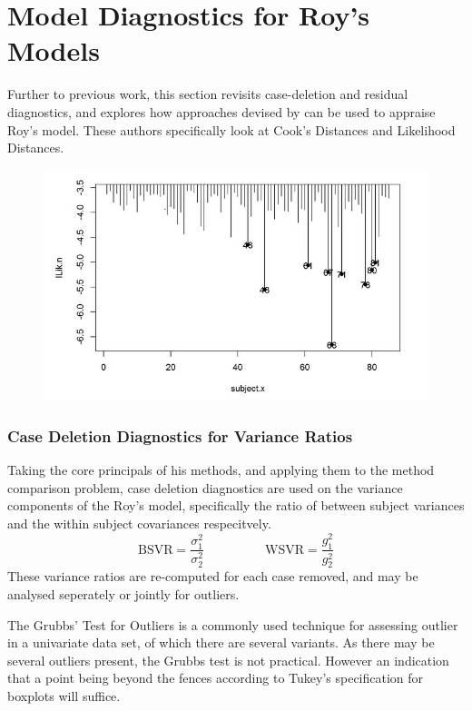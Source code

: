 \documentclass[12pt, a4paper]{report}
\theoremstyle{plain}
\theoremstyle{definition}
\theoremstyle{remark}
\begin{document}
	
	

	\section{Model Diagnostics for Roy's Models}
	
	Further to previous work, this section revisits case-deletion and residual diagnostics, and explores how approaches devised by \citet{Galecki} can be used to appraise Roy's model. These authors specifically look at Cook's Distances and Likelihood Distances.
	
	
	
	
	
	\begin{figure}[h!]
		\centering
		\includegraphics[width=0.7\linewidth]{images/LogLik-JS-Roy}
		\caption{}
		\label{fig:LogLik-JS-Roy}
	\end{figure}
\newpage	
\subsubsection{Case Deletion Diagnostics for Variance Ratios}
Taking the core principals of his methods, and applying them to the method comparison problem, case deletion diagnostics are used on the variance components of the Roy's model, specifically the ratio of between subject variances and the within subject covariances respecitvely.
\[ \mbox{BSVR} = \frac{\sigma^2_1}{\sigma^2_2} \phantom{makespace}  \mbox{WSVR} = \frac{g^2_1}{g^2_2} \]
These variance ratios are re-computed for each case removed, and may be analysed seperately or jointly for outliers.
	
The Grubbs' Test for Outliers is a commonly used technique for assessing outlier in a univariate data set, of which there are several variants. As there may be several outliers present, the Grubbs test is not practical. However an indication that a point being beyond the fences according to Tukey's specification for boxplots will suffice.
	
\end{document}
